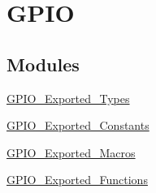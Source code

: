 \hypertarget{group__GPIO}{
\section{GPIO}
\label{group__GPIO}
}
\subsection*{Modules}
\begin{DoxyCompactItemize}
\item 
\hyperlink{group__GPIO__Exported__Types}{GPIO\_\-Exported\_\-Types}
\item 
\hyperlink{group__GPIO__Exported__Constants}{GPIO\_\-Exported\_\-Constants}
\item 
\hyperlink{group__GPIO__Exported__Macros}{GPIO\_\-Exported\_\-Macros}
\item 
\hyperlink{group__GPIO__Exported__Functions}{GPIO\_\-Exported\_\-Functions}
\end{DoxyCompactItemize}
